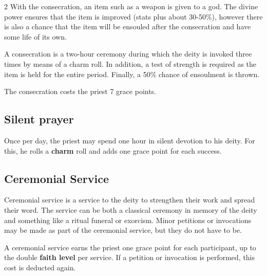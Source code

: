 \begin{multicols}{2}
With the consecration, an item such as a weapon is given to a god. The divine power ensures that the item is improved (stats plus about 30-50\%), however there is also a chance that the item will be ensouled after the consecration and have some life of its own.

A consecration is a two-hour ceremony during which the deity is invoked three times by means of a charm roll. In addition, a test of strength is required as the item is held for the entire period. Finally, a 50\% chance of ensoulment is thrown.

The consecration costs the priest 7 grace points.

\subsection{Silent prayer}

Once per day, the priest may spend one hour in silent devotion to his deity. For this, he rolls a \textbf{charm} roll and adds one grace point for each success.

\subsection{Ceremonial Service}

Ceremonial service is a service to the deity to strengthen their work and spread their word. The service can be both a classical ceremony in memory of the deity and something like a ritual funeral or exorcism. Minor petitions or invocations may be made as part of the ceremonial service, but they do not have to be.

A ceremonial service earns the priest one grace point for each participant, up to the double \textbf{faith level} per service. If a petition or invocation is performed, this cost is deducted again.
\end{multicols}
